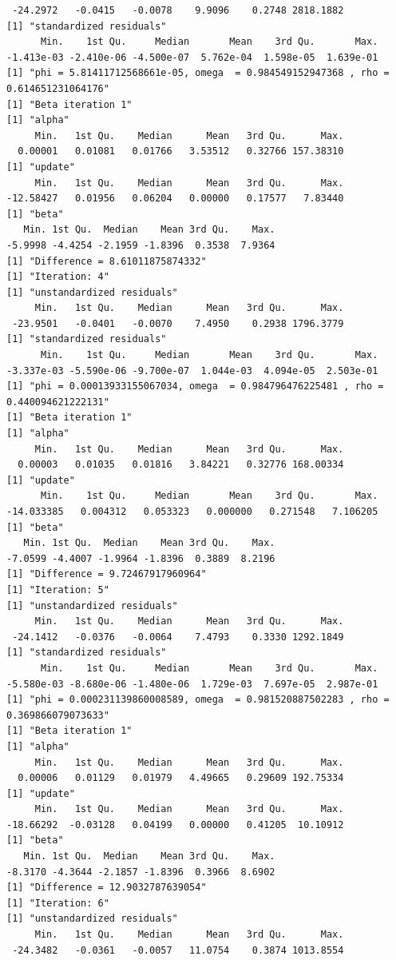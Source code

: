 \documentclass[10pt]{article}
\theoremstyle{definition}
\begin{document}
\begin{itemize}
\begin{verbatim}
 -24.2972   -0.0415   -0.0078    9.9096    0.2748 2818.1882
[1] "standardized residuals"
      Min.    1st Qu.     Median       Mean    3rd Qu.       Max.
-1.413e-03 -2.410e-06 -4.500e-07  5.762e-04  1.598e-05  1.639e-01
[1] "phi = 5.81411712568661e-05, omega  = 0.984549152947368 , rho = 0.614651231064176"
[1] "Beta iteration 1"
[1] "alpha"
     Min.   1st Qu.    Median      Mean   3rd Qu.      Max.
  0.00001   0.01081   0.01766   3.53512   0.32766 157.38310
[1] "update"
     Min.   1st Qu.    Median      Mean   3rd Qu.      Max.
-12.58427   0.01956   0.06204   0.00000   0.17577   7.83440
[1] "beta"
   Min. 1st Qu.  Median    Mean 3rd Qu.    Max.
-5.9998 -4.4254 -2.1959 -1.8396  0.3538  7.9364
[1] "Difference = 8.61011875874332"
[1] "Iteration: 4"
[1] "unstandardized residuals"
     Min.   1st Qu.    Median      Mean   3rd Qu.      Max.
 -23.9501   -0.0401   -0.0070    7.4950    0.2938 1796.3779
[1] "standardized residuals"
      Min.    1st Qu.     Median       Mean    3rd Qu.       Max.
-3.337e-03 -5.590e-06 -9.700e-07  1.044e-03  4.094e-05  2.503e-01
[1] "phi = 0.00013933155067034, omega  = 0.984796476225481 , rho = 0.440094621222131"
[1] "Beta iteration 1"
[1] "alpha"
     Min.   1st Qu.    Median      Mean   3rd Qu.      Max.
  0.00003   0.01035   0.01816   3.84221   0.32776 168.00334
[1] "update"
      Min.    1st Qu.     Median       Mean    3rd Qu.       Max.
-14.033385   0.004312   0.053323   0.000000   0.271548   7.106205
[1] "beta"
   Min. 1st Qu.  Median    Mean 3rd Qu.    Max.
-7.0599 -4.4007 -1.9964 -1.8396  0.3889  8.2196
[1] "Difference = 9.72467917960964"
[1] "Iteration: 5"
[1] "unstandardized residuals"
     Min.   1st Qu.    Median      Mean   3rd Qu.      Max.
 -24.1412   -0.0376   -0.0064    7.4793    0.3330 1292.1849
[1] "standardized residuals"
      Min.    1st Qu.     Median       Mean    3rd Qu.       Max.
-5.580e-03 -8.680e-06 -1.480e-06  1.729e-03  7.697e-05  2.987e-01
[1] "phi = 0.000231139860008589, omega  = 0.981520887502283 , rho = 0.369866079073633"
[1] "Beta iteration 1"
[1] "alpha"
     Min.   1st Qu.    Median      Mean   3rd Qu.      Max.
  0.00006   0.01129   0.01979   4.49665   0.29609 192.75334
[1] "update"
     Min.   1st Qu.    Median      Mean   3rd Qu.      Max.
-18.66292  -0.03128   0.04199   0.00000   0.41205  10.10912
[1] "beta"
   Min. 1st Qu.  Median    Mean 3rd Qu.    Max.
-8.3170 -4.3644 -2.1857 -1.8396  0.3966  8.6902
[1] "Difference = 12.9032787639054"
[1] "Iteration: 6"
[1] "unstandardized residuals"
     Min.   1st Qu.    Median      Mean   3rd Qu.      Max.
 -24.3482   -0.0361   -0.0057   11.0754    0.3874 1013.8554

\end{verbatim}
\end{itemize}
\end{document}

